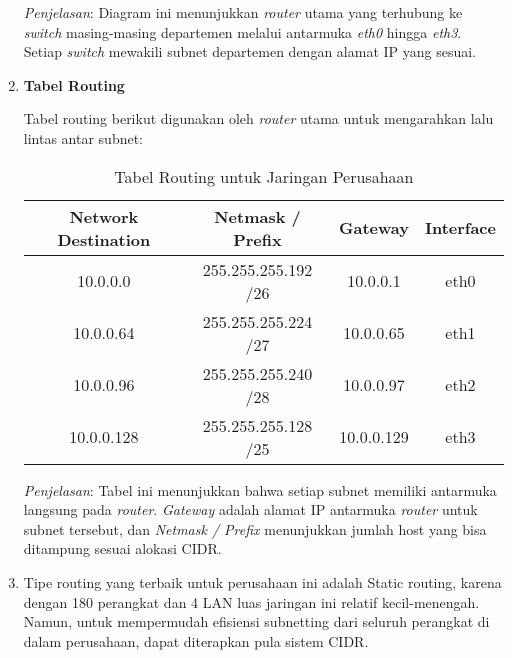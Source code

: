 \begin{enumerate}
\begin{center}
    \end{center}

    \textit{Penjelasan}: Diagram ini menunjukkan \textit{router} utama yang terhubung ke \textit{switch} masing-masing departemen melalui antarmuka \textit{eth0} hingga \textit{eth3}. Setiap \textit{switch} mewakili subnet departemen dengan alamat IP yang sesuai.

\item \textbf{Tabel Routing}

Tabel routing berikut digunakan oleh \textit{router} utama untuk mengarahkan lalu lintas antar subnet:

\begin{table}[h]
\centering
\caption{Tabel Routing untuk Jaringan Perusahaan}
\renewcommand{\arraystretch}{1.3} %
\begin{tabular}{|c|c|c|c|}
\hline
\textbf{Network Destination} & \textbf{Netmask / Prefix} & \textbf{Gateway} & \textbf{Interface} \\ \hline
10.0.0.0 & 255.255.255.192 /26 & 10.0.0.1 & eth0 \\ \hline
10.0.0.64 & 255.255.255.224 /27 & 10.0.0.65 & eth1 \\ \hline
10.0.0.96 & 255.255.255.240 /28 & 10.0.0.97 & eth2 \\ \hline
10.0.0.128 & 255.255.255.128 /25 & 10.0.0.129 & eth3 \\ \hline
\end{tabular}
\end{table}

\textit{Penjelasan}: Tabel ini menunjukkan bahwa setiap subnet memiliki antarmuka langsung pada \textit{router}. \textit{Gateway} adalah alamat IP antarmuka \textit{router} untuk subnet tersebut, dan \textit{Netmask / Prefix} menunjukkan jumlah host yang bisa ditampung sesuai alokasi CIDR.
	\item Tipe routing yang terbaik untuk perusahaan ini adalah Static routing, karena dengan 180 perangkat dan 4 LAN luas jaringan ini relatif kecil-menengah. Namun, untuk mempermudah efisiensi subnetting dari seluruh perangkat di dalam perusahaan, dapat diterapkan pula sistem CIDR.
    
\end{enumerate}